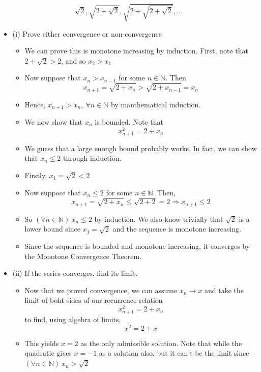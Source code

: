 \documentclass{article}
\begin{document}
\begin{itemize}
    \[
    \sqrt{2}, \sqrt{2+\sqrt{2}}, \sqrt{2+\sqrt{2+\sqrt{2}}},\dots
    \]
    \begin{itemize}
        \item (i) Prove either convergence or non-convergence
        \begin{itemize}
            \item We can prove this is monotone increasing by induction. First, note that $2+\sqrt{2} > 2$, and so $x_2 > x_1$
            \item Now suppose that $x_n > x_{n-1}$ for some $n \in \mathbb{N}$. Then
            \[
            x_{n+1} = \sqrt{2 + x_n} > \sqrt{2+ x_{n-1}} = x_n
            \]
            \item Hence, $x_{n+1} > x_n, \ \forall n \in \mathbb{N}$ by manthematical induction.
            \item We now show that $x_n$ is bounded. Note that
            \[
            x_{n+1}^2 = 2 + x_n
            \]
            \item We guess that a large enough bound probably works. In fact, we can show that $x_n \le 2$ through induction.
            \item Firstly, $x_1 = \sqrt{2} < 2$
            \item Now suppose that $x_n \le 2$ for some $n \in \mathbb{N}$. Then,
            \[
            x_{n+1} = \sqrt{2 + x_n} \le \sqrt{2+2} =2 \Rightarrow x_{n+1} \le 2
            \]
            \item So $(\forall n \in \mathbb{N}) \ x_n \le 2$ by induction. We also know trivially that $\sqrt{2}$ is a lower bound since $x_1 = \sqrt{2}$ and the sequence is monotone increasing.
            \item Since the sequence is bounded and monotone increasing, it converges by the Monotone Convergence Theorem.
        \end{itemize}
        \item (ii) If the series converges, find its limit.
        \begin{itemize}
            \item Now that we proved convergence, we can assume $x_n \rightarrow x$ and take the limit of boht sides of our recurrence relation
            \[
            x_{n+1}^2 = 2 + x_n
            \]
            to find, using algebra of limits,
            \[
            x^2 = 2 + x
            \]
            \item This yields $x=2$ as the only admissible solution. Note that while the quadratic gives $x=-1$ as a solution also, but it can't be the limit since $(\forall n \in \mathbb{N}) \ x_n > \sqrt{2}$

\end{itemize}
\end{itemize}
\end{itemize}
\end{document}
